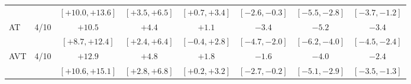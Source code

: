 \begin{table}[t]
\begin{tabular}{@{}lc*{6}{c}@{}}
 & & \tiny$[+10.0, +13.6]$ & \tiny$[+3.5, +6.5]$ & \tiny$[+0.7, +3.4]$ & \tiny$[-2.6, -0.3]$ & \tiny$[-5.5, -2.8]$ & \tiny$[-3.7, -1.2]$ \\[2pt]
AT & 4/10 & $+10.5$ & $+4.4$ & $+1.1$ & $-3.4$ & $-5.2$ & $-3.4$ \\
 & & \tiny$[+8.7, +12.4]$ & \tiny$[+2.4, +6.4]$ & \tiny$[-0.4, +2.8]$ & \tiny$[-4.7, -2.0]$ & \tiny$[-6.2, -4.0]$ & \tiny$[-4.5, -2.4]$ \\[2pt]
AVT & 4/10 & $+12.9$ & $+4.8$ & $+1.8$ & $-1.6$ & $-4.0$ & $-2.4$ \\
 & & \tiny$[+10.6, +15.1]$ & \tiny$[+2.8, +6.8]$ & \tiny$[+0.2, +3.2]$ & \tiny$[-2.7, -0.2]$ & \tiny$[-5.1, -2.9]$ & \tiny$[-3.5, -1.3]$ \\[2pt]
\bottomrule
\end{tabular}
\end{table}
